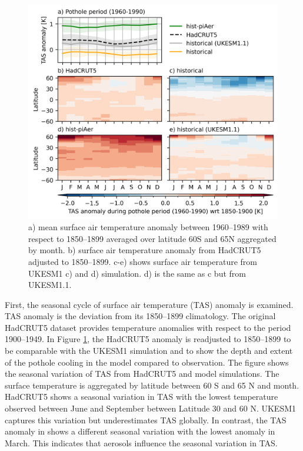 \begin{figure}
    \centering
    \includegraphics{Chapter4/Figs/TAS_anomaly_pothole.png}
    \caption[Surface air anomaly from HadCRUT5, UKESM1 and UKESM1.1 between 1960 and 1989]{a) mean surface air temperature anomaly between 1960--1989 with respect to 1850--1899 averaged over latitude 60\textdegree S and 65\textdegree N aggregated by month. b) surface air temperature anomaly from HadCRUT5 adjusted to 1850--1899. c-e) shows surface air temperature from UKESM1 c) \hist{} and d) \histpiaer{} simulation. d) is the same as c but from UKESM1.1. }
    \label{fig:ch4:seasonal-tas-anomaly-pothole}
\end{figure}

First, the seasonal cycle of surface air temperature (TAS) anomaly is examined. TAS anomaly is the deviation from its 1850--1899 climatology. The original HadCRUT5 dataset provides temperature anomalies with respect to the period 1900--1949. In Figure \ref{fig:ch4:seasonal-tas-anomaly-pothole}, the HadCRUT5 anomaly is readjusted to 1850--1899 to be comparable with the UKESM1 simulation and to show the depth and extent of the pothole cooling in the model compared to observation. The figure shows the seasonal variation of TAS from HadCRUT5 and model simulations. The surface temperature is aggregated by latitude between 60 \textdegree S and 65 \textdegree N and month. HadCRUT5 shows a seasonal variation in TAS with the lowest temperature observed between June and September between Latitude 30 and 60 \textdegree N. UKESM1 captures this variation but underestimates TAS globally. In contrast, the TAS anomaly in \histpiaer{} shows a different seasonal variation with the lowest anomaly in March. This indicates that aerosols influence the seasonal variation in TAS. 


